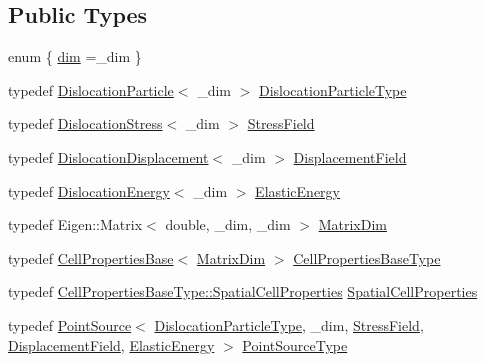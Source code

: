 \subsection*{Public Types}
\begin{DoxyCompactItemize}
\item 
enum \{ \hyperlink{structmodel_1_1_dislocation_particle_a4bd5db323619f407d2eaa5a87db2037eafe66120ebb7ec585463b43b9b7b9be22}{dim} =\+\_\+dim
 \}
\item 
typedef \hyperlink{structmodel_1_1_dislocation_particle}{Dislocation\+Particle}$<$ \+\_\+dim $>$ \hyperlink{structmodel_1_1_dislocation_particle_a707bb7bef0eeac9a9281626d2b30fdc6}{Dislocation\+Particle\+Type}
\item 
typedef \hyperlink{structmodel_1_1_dislocation_stress}{Dislocation\+Stress}$<$ \+\_\+dim $>$ \hyperlink{structmodel_1_1_dislocation_particle_a11c4d91265aef10567dc83b869e06fd5}{Stress\+Field}
\item 
typedef \hyperlink{structmodel_1_1_dislocation_displacement}{Dislocation\+Displacement}$<$ \+\_\+dim $>$ \hyperlink{structmodel_1_1_dislocation_particle_a3c35f30e393557a4bcb372f270403c31}{Displacement\+Field}
\item 
typedef \hyperlink{classmodel_1_1_dislocation_energy}{Dislocation\+Energy}$<$ \+\_\+dim $>$ \hyperlink{structmodel_1_1_dislocation_particle_acb452e4510d2079aa300effcf6829e6f}{Elastic\+Energy}
\item 
typedef Eigen\+::\+Matrix$<$ double, \+\_\+dim, \+\_\+dim $>$ \hyperlink{structmodel_1_1_dislocation_particle_a4fb98d6dbd350e248452f5bbcb3078f3}{Matrix\+Dim}
\item 
typedef \hyperlink{structmodel_1_1_cell_properties_base}{Cell\+Properties\+Base}$<$ \hyperlink{structmodel_1_1_dislocation_particle_a4fb98d6dbd350e248452f5bbcb3078f3}{Matrix\+Dim} $>$ \hyperlink{structmodel_1_1_dislocation_particle_ae19c66fb92f6fcdf3796257f48fdfb36}{Cell\+Properties\+Base\+Type}
\item 
typedef \hyperlink{structmodel_1_1_cell_properties_base_a78639859408d4df5b219a09356a39fa8}{Cell\+Properties\+Base\+Type\+::\+Spatial\+Cell\+Properties} \hyperlink{structmodel_1_1_dislocation_particle_aff639d1f8cef2fdfe9fd8b69619544d7}{Spatial\+Cell\+Properties}
\item 
typedef \hyperlink{structmodel_1_1_point_source}{Point\+Source}$<$ \hyperlink{structmodel_1_1_dislocation_particle_a707bb7bef0eeac9a9281626d2b30fdc6}{Dislocation\+Particle\+Type}, \+\_\+dim, \hyperlink{structmodel_1_1_dislocation_particle_a11c4d91265aef10567dc83b869e06fd5}{Stress\+Field}, \hyperlink{structmodel_1_1_dislocation_particle_a3c35f30e393557a4bcb372f270403c31}{Displacement\+Field}, \hyperlink{structmodel_1_1_dislocation_particle_acb452e4510d2079aa300effcf6829e6f}{Elastic\+Energy} $>$ \hyperlink{structmodel_1_1_dislocation_particle_ad7cb10ddeebde76213ecd273bf323bf0}{Point\+Source\+Type}

\end{DoxyCompactItemize}
